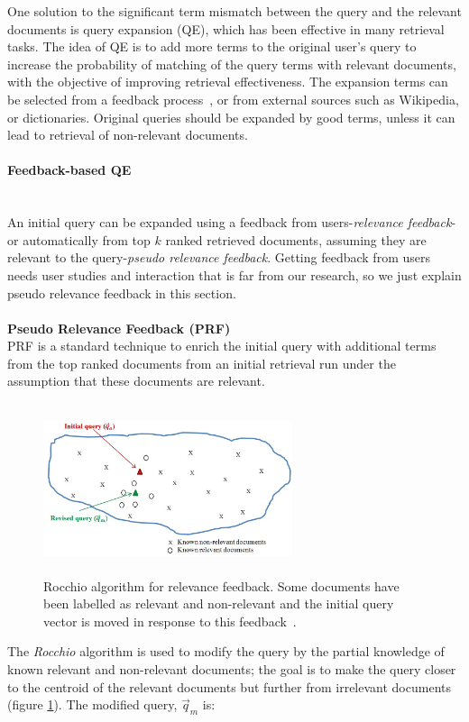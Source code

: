 One solution to the significant term mismatch between the query and the relevant documents is query expansion (QE), which has been effective in many retrieval tasks. The idea of QE is to add more terms to the original user's query to increase the probability of matching of the query terms with relevant documents, with the objective of improving retrieval effectiveness. The expansion terms can be selected from a feedback process~\citep{cao2008selecting}, or from external sources such as Wikipedia, or dictionaries. Original queries should be expanded by good terms, unless it can lead to retrieval of non-relevant documents.
\paragraph{Feedback-based QE}
\ \\
An initial query can be expanded using a feedback from users-\textit{relevance feedback}-or automatically from top $ k $ ranked retrieved documents, assuming they are relevant to the query-\textit{pseudo relevance feedback}. Getting feedback from  users needs user studies and interaction that is far from our research, so we just explain pseudo relevance feedback in this section. \\\\
\textbf{Pseudo Relevance Feedback (PRF)} 
\ \\
PRF is a standard technique to enrich the initial query with additional terms from the top ranked documents from an initial retrieval run under the assumption that these documents are relevant.
\begin{figure}[htpb]
   \centering
   \includegraphics[width=0.65\textwidth,height=50mm]{figs/rocchio.jpg}
   \caption{Rocchio algorithm for relevance feedback. Some documents have been labelled as relevant and non-relevant and the initial query vector is moved in response to this feedback~\citep{manning2008introduction}.}  
   \label{fig:rocchio} 
\end{figure}
\FloatBarrier 
\noindent
The \textit{Rocchio} algorithm is used to modify the query by the partial knowledge of known relevant and non-relevant documents; the goal is to make the query closer to the centroid of the relevant documents but further from irrelevant documents (figure \ref{fig:rocchio}). The modified query, $ \vec{q}_m $ is:
